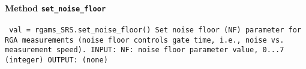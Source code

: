 \paragraph{Method \texttt{set_noise_floor}}
\vspace{1ex}
\texttt{\newline
val = rgams_SRS.set_noise_floor()\newline
\newline
Set noise floor (NF) parameter for RGA measurements (noise floor controls gate time, i.e., noise vs. measurement speed).\newline
\newline
INPUT:\newline
NF: noise floor parameter value, 0...7 (integer)\newline
\newline
OUTPUT:\newline
(none)\newline
\newline
}


